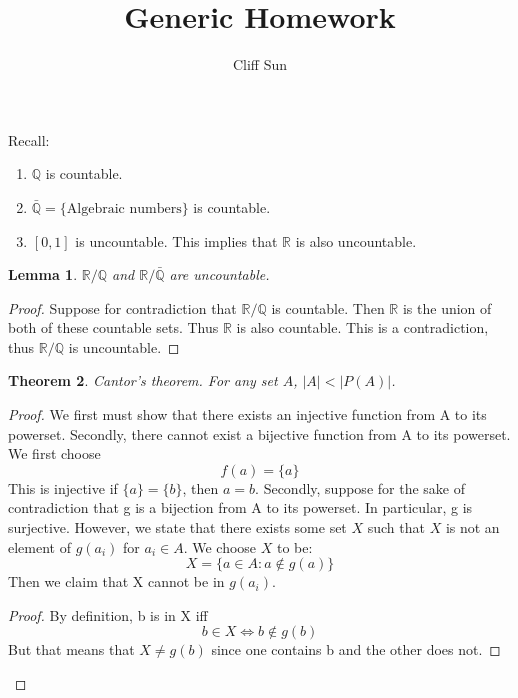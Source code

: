 \documentclass{article}
\title{Generic Homework}
\author{Cliff Sun}
\newtheorem{theorem}{Theorem}[section]
\newtheorem{lemma}[theorem]{Lemma}
\begin{document}
\maketitle

Recall:

\begin{enumerate}
    \item $\mathbb{Q}$ is countable.
    \item $\bar{\mathbb{Q}} = \{\textrm{Algebraic numbers}\}$ is countable.
    \item $[0,1]$ is uncountable. This implies that $\mathbb{R}$ is also uncountable. 
\end{enumerate}

\begin{lemma}
    $\mathbb{R}/\mathbb{Q}$ and $\mathbb{R}/\bar{\mathbb{Q}}$ are uncountable. 
\end{lemma}

\begin{proof}
    Suppose for contradiction that $\mathbb{R}/\mathbb{Q}$ is countable. Then $\mathbb{R}$ is the union of both of these countable sets. Thus $\mathbb{R}$ is also countable. This is a contradiction, thus $\mathbb{R}/\mathbb{Q}$ is uncountable. 
\end{proof}

\begin{theorem}
    Cantor's theorem. For any set $A$, $|A| < |P(A)|$. 
\end{theorem}

\begin{proof}
    We first must show that there exists an injective function from A to its powerset. Secondly, there cannot exist a bijective function from A to its powerset. We first choose
    \begin{equation}
        f(a) = \{a\}
    \end{equation}
    This is injective if $\{a\} = \{b\}$, then $a = b$. Secondly, suppose for the sake of contradiction that g is a bijection from A to its powerset. In particular, g is surjective. However, we state that there exists some set
    $X$ such that $X$ is not an element of $g(a_i)$ for $a_i \in A$. We choose $X$ to be:
    \begin{equation}
        X = \{a \in A : a \notin g(a)\}
    \end{equation}
    Then we claim that X cannot be in $g(a_i)$. 
    \begin{proof}
        By definition, b is in X iff
        \begin{equation}
            b \in X \iff b \notin g(b)
        \end{equation}
        But that means that $X \neq g(b)$ since one contains b and the other does not. 
    \end{proof}
\end{proof}
\end{document}
